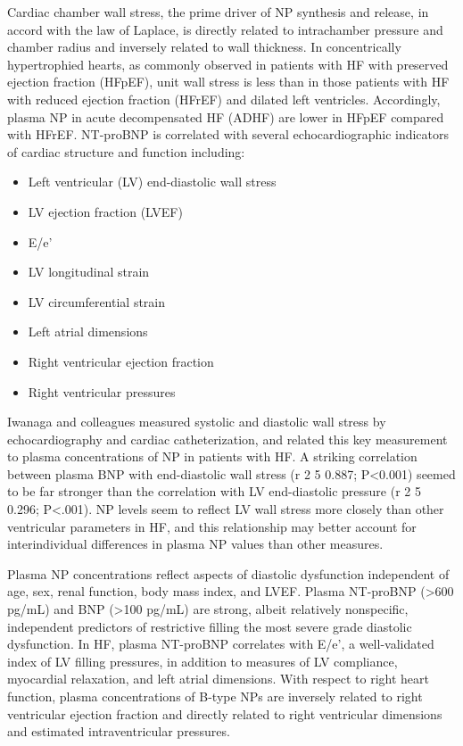\documentclass[14pt,a4paper,onecolumn]{extarticle}
\begin{document}
Cardiac chamber wall stress, the prime driver of NP synthesis and release, in accord with the law of Laplace, is directly related to intrachamber pressure and chamber radius and inversely related to wall thickness. In concentrically hypertrophied hearts, as commonly observed in patients with HF with preserved ejection fraction (HFpEF), unit wall stress is less than in those patients with HF with reduced ejection fraction (HFrEF) and dilated left ventricles. Accordingly, plasma NP in acute decompensated HF (ADHF) are lower in HFpEF compared with HFrEF. NT-proBNP is correlated with several echocardiographic indicators of cardiac structure and function including: \begin{itemize}   \item Left ventricular (LV) end-diastolic wall stress   \item LV ejection fraction (LVEF)   \item E/e’   \item LV longitudinal strain   \item LV circumferential strain   \item Left atrial dimensions   \item Right ventricular ejection fraction   \item Right ventricular pressures \end{itemize} \citep{Richards2018}

Iwanaga and colleagues measured systolic and diastolic wall stress by echocardiography and cardiac catheterization, and related this key measurement to plasma concentrations of NP in patients with HF. A striking correlation between plasma BNP with end-diastolic wall stress (r 2 5 0.887; P<0.001) seemed to be far stronger than the correlation with LV end-diastolic pressure (r 2 5 0.296; P<.001). NP levels seem to reflect LV wall stress more closely than other ventricular parameters in HF, and this relationship may better account for interindividual differences in plasma NP values than other measures. \citep{Iwanaga2006}

Plasma NP concentrations reflect aspects of diastolic dysfunction independent of age, sex, renal function, body mass index, and LVEF. Plasma NT-proBNP (>600 pg/mL) and BNP (>100 pg/mL) are strong, albeit relatively nonspecific, independent predictors of restrictive filling the most severe grade diastolic dysfunction. In HF, plasma NT-proBNP correlates with E/e’, a well-validated index of LV filling pressures, in addition to measures of LV compliance, myocardial relaxation, and left atrial dimensions. With respect to right heart function, plasma concentrations of B-type NPs are inversely related to right ventricular ejection fraction and directly related to right ventricular dimensions and estimated intraventricular pressures. \citep{Troughton2009}
\end{document}
